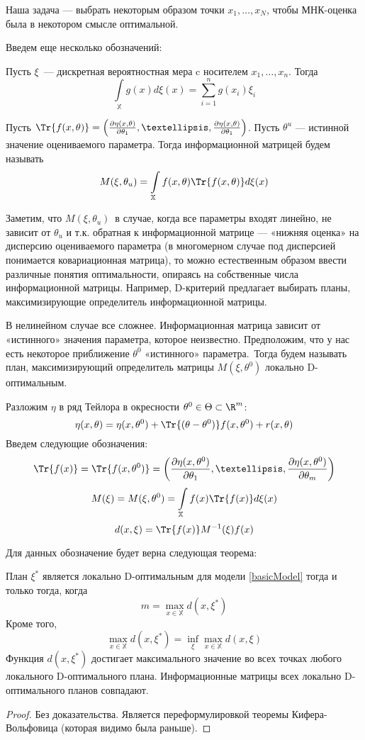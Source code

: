 Наша задача — выбрать некоторым образом точки $x_1, …, x_N$, чтобы МНК-оценка была в некотором смысле оптимальной. 

Введем еще несколько обозначений:
\begin{dfn}
Пусть $\xi$ — дискретная вероятностная мера c носителем $x_1,…, x_n$. Тогда
$$ \int\limits_{\mathbb{X}} g(x) d\xi(x) = \sum \limits_{i=1}^{n}  g(x_i)\xi_i$$
\end{dfn}

\begin{dfn}
Пусть $\Tr{f(x,\theta)} = \left(\frac{\partial\eta(x,\theta)}{\partial \theta_1}, …, \frac{\partial\eta(x,\theta)}{\partial \theta_1}\right)$. 
Пусть $\theta^u$ — истинной значение оцениваемого параметра. Тогда информационной матрицей будем называть
$$M(\xi, \theta_u) = \int\limits_{\mathbb{X}} f(x, \theta)\Tr{f(x, \theta)}d\xi(x)$$
\end{dfn}


Заметим, что $M(\xi, \theta_u)$ в случае, когда все параметры входят линейно, не зависит от $\theta_u$ и  т.к. обратная к информационной матрице — «нижняя оценка» на дисперсию оцениваемого параметра (в многомерном случае под дисперсией  понимается ковариационная матрица), то можно естественным образом ввести различные понятия оптимальности, опираясь на собственные числа информационной матрицы. Например, D-критерий предлагает выбирать планы, максимизирующие определитель информационной матрицы. 

В нелинейном случае все сложнее. Информационная матрица зависит от «истинного» значения параметра, которое неизвестно. Предположим, что у нас есть некоторое приближение $\theta^0$ «истинного» параметра. Тогда будем называть план, максимизирующий определитель матрицы $M(\xi, \theta^0)$ локально D-оптимальным. 

Разложим $\eta$ в ряд Тейлора в окресности $\theta^0 \in \Theta \subset \R^m$:
$$\eta(x, \theta) = \eta(x, \theta^0) + \Tr{(\theta-\theta^0)}f(x, \theta^0) + r(x,\theta)$$
Введем следующие обозначения:
$$ \Tr{f(x)} = \Tr{f(x, \theta^0)} = \left(\frac{\partial \eta(x, \theta^0)}{\partial\theta_1}, …, \frac{\partial \eta(x, \theta^0)}{\partial \theta_m}\right)$$
$$ M(\xi) = M(\xi, \theta^0) = \int\limits_{\mathbb{X}} f(x) \Tr{f(x)}d\xi(x)$$
$$d(x, \xi) = \Tr{f(x)} M^{-1}(\xi)f(x)$$

Для данных обозначение будет верна следующая теорема:
\begin{thm}[Эквивалентности]
План $\xi^*$ является локально D-оптимальным для модели \eqref{basicModel} тогда и только тогда, когда 
$$ m = \max\limits_{x\in \mathbb{X}} d(x, \xi^*)$$
Кроме того, 
$$ \max \limits_{x \in \mathbb{X}} d(x, \xi^*) = \inf\limits_{\xi}\max\limits_{x\in\mathbb{X}} d(x, \xi)$$
Функция $d(x, \xi^*)$ достигает максимального значение во всех точках любого локального D-оптимального плана.
Информационные матрицы всех локально D-оптимального планов совпадают.
\end{thm}
\begin{proof}
Без доказательства. Является переформулировкой теоремы Кифера-Вольфовица (которая видимо была раньше).
\end{proof}



